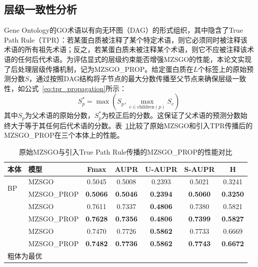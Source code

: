 \subsection{层级一致性分析}

Gene Ontology的GO术语以有向无环图（DAG）的形式组织，其中隐含了True Path Rule（TPR）\cite{notaro2021hemdag}：若某蛋白质被注释了某个特定术语，则它必须同时被注释该术语的所有祖先术语；反之，若某蛋白质未被注释某个术语，则它不应被注释该术语的任何后代术语。为评估显式的层级约束能否增强MZSGO的性能，本论文实现了后处理层级传播机制，记为MZSGO\_PROP。给定蛋白质在$L$个标签上的原始预测分数$S$，通过按照DAG结构将子节点的最大分数传播至父节点来确保层级一致性，如公式~\eqref{eq:tpr_propagation}所示：
\begin{equation}
\label{eq:tpr_propagation}
    S_{p}^* = \max \left( S_p, \max_{c \in \text{children}(p)} S_c \right)
\end{equation}
其中$S_p$为父术语的原始分数，$S_{p}^*$为校正后的分数。这保证了父术语的预测分数始终大于等于其任何后代术语的分数。表~\ref{tab:mzsgo_tpr}比较了原始MZSGO和引入TPR传播后的MZSGO\_PROP在三个本体上的性能。

\begin{table}[htbp]
    \centering
    \caption{原始MZSGO与引入True Path Rule传播的MZSGO\_PROP的性能对比}
    \label{tab:mzsgo_tpr}
    \small
    \begin{tabular}{llccccc}
        \toprule
        \textbf{本体} & \textbf{模型} & \textbf{Fmax} & \textbf{AUPR} & \textbf{U-AUPR} & \textbf{S-AUPR} & \textbf{H} \\
        \midrule
        \multirow{2}{*}{BP} & MZSGO & 0.5045 & 0.5008 & 0.2393 & 0.5021 & 0.3241 \\
         & MZSGO\_PROP & \textbf{0.5066} & \textbf{0.5046} & \textbf{0.2394} & \textbf{0.5060} & \textbf{0.3250} \\
        \addlinespace[5pt]
        \multirow{2}{*}{MF} & MZSGO & 0.7611 & 0.7337 & \textbf{0.4806} & 0.7380 & 0.5821 \\
         & MZSGO\_PROP & \textbf{0.7628} & \textbf{0.7356} & \textbf{0.4806} & \textbf{0.7399} & \textbf{0.5827} \\
        \addlinespace[5pt]
        \multirow{2}{*}{CC} & MZSGO & 0.7470 & 0.7726 & \textbf{0.5862} & 0.7733 & 0.6669 \\
         & MZSGO\_PROP & \textbf{0.7482} & \textbf{0.7736} & \textbf{0.5862} & \textbf{0.7743} & \textbf{0.6672} \\
        \bottomrule
\multicolumn{7}{l}{\vspace{0.2em}\footnotesize 粗体为最优} \\
    \end{tabular}
\end{table}

